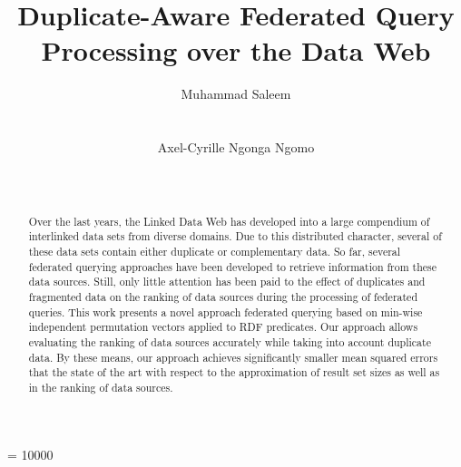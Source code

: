 \documentclass{sig-alternate}  %
\begin{document}
\widowpenalty = 10000


\title{Duplicate-Aware Federated Query Processing over the Data Web}

\author{
\alignauthor
Muhammad Saleem\\
       \\
       \\ 
\alignauthor
Axel-Cyrille Ngonga Ngomo\\
       \\
       \\
}

\maketitle

\begin{abstract}
Over the last years, the Linked Data Web has developed into a large compendium of interlinked data sets from diverse domains.
Due to this distributed character, several of these data sets contain either duplicate or complementary data. 
So far, several federated querying approaches have been developed to retrieve information from these data sources.
Still, only little attention has been paid to the effect of duplicates and fragmented data on the ranking of data sources during the processing of federated queries.
This work presents a novel approach federated querying based on min-wise independent permutation vectors applied to RDF predicates.
Our approach allows evaluating the ranking of data sources accurately while taking into account duplicate data.
By these means, our approach achieves significantly smaller mean squared errors that the state of the art with respect to the approximation of result set sizes as well as in the ranking of data sources. 
 \end{abstract}
\end{document}
